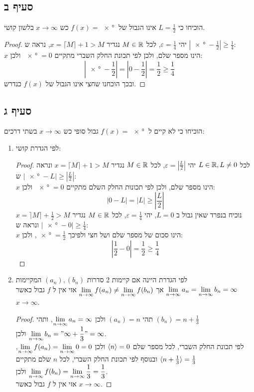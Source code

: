 \documentclass{article}
\begin{document}
	\subsection*{סעיף ב}
	הוכיחו כי $L = \frac{1}{2}$ אינו הגבול של $f(x) = \ang{x}$ כש $x \to \infty$ בלשון קושי.
	\begin{proof}
		יהי $\varepsilon = \frac{1}{4}$, לכל $M \in \mathbb{R}$ נגדיר $x = \lceil M \rceil + 1 > M$,
		נראה ש $|\ang{x} - \frac{1}{2}| \geq \frac{1}{4}$: \\
		$x$ הינו מספר שלם, ולכן לפי תכונת החלק השברי מתקיים $\ang{x} = 0$ ולכן:
		\[
			\left| \ang{x} - \frac{1}{2} \right| =
			\left| 0 - \frac{1}{2} \right| =
			\frac{1}{2} \geq \frac{1}{4}
		\]
		ובכך הוכחנו שחצי אינו הגבול של $f(x)$ כנדרש.
	\end{proof}

	\pagebreak

	\subsection*{סעיף ג}
	הוכיחו כי לא קיים ל $f(x) = \ang{x}$ גבול סופי כש $x \to \infty$ בשתי דרכים:
	\begin{enumerate}
		\item לפי הגדרת קושי:
		\begin{proof}
			לכל $L \in \mathbb{R}, L \neq 0$ יהי $\varepsilon = \left| \frac{L}{2} \right|$, לכל $M \in \mathbb{R}$ נגדיר $x = \lceil M \rceil + 1 > M$ ונראה ש $|\ang{x} - L| \geq \left| \frac{L}{2} \right|$: \\
			$x$ הינו מספר שלם, ולכן לפי תכונות החלק השלם מתקיים $\ang{x} = 0$ ולכן:
			\[
				\left|0 - L \right| = |L| \geq \left| \frac{L}{2} \right|
			\]
			נוכיח בנפרד שאין גבול ב $L = 0$, יהי $\varepsilon = \frac{1}{4}$, לכל $M \in \mathbb{R}$ נגדיר $x = \rceil M \rceil + \frac{1}{2} > M$ ונראה ש $|\ang{x} - 0| \geq \frac{1}{4}$: \\
			$x$ הינו סכום של מספר שלם ושל חצי ולפיכך $\ang{x} = \frac{1}{2}$, ולכן:
			\[
			\left| \frac{1}{2} - 0 \right| = \frac{1}{2} \geq \frac{1}{4}
			\]
		\end{proof}

		\item לפי הגדרת היינה אם קיימות 2 סדרות $(a_n), (b_n)$ המקיימות $\displaystyle{\lim_{n \to \infty}a_n = \lim_{n \to \infty}b_n = \infty}$ אך $\displaystyle{\lim_{n \to \infty}f(a_n) \neq \lim_{n \to \infty}f(b_n)}$ אזי אין ל $f$ גבול כאשר $x \to \infty$. \\
		\begin{proof} \nl
			תהי $(a_n) = n$ ולכן $\displaystyle{\lim_{n \to \infty}a_n = \infty}$, ותהי $(b_n) = n + \frac{1}{3}$ \\
			 ולכן $\displaystyle{\lim_{n \to \infty}b_n = "\infty + \frac{1}{3}" = \infty}$. \\
			לפי תכונת החלק השברי, לכל מספר שלם $\langle n \rangle = 0$ ולכן $\displaystyle{\lim_{n \to \infty}f(a_n) = \lim_{n \to \infty}0 = 0}$,
			 ובנוסף לפי תכונת החלק השברי, לכל $n$ שלם מתקיים $\langle n + \frac{1}{3} \rangle = \frac{1}{3}$ \\
			 ולכן $\displaystyle{\lim_{n \to \infty}f(b_n) = \lim_{n \to \infty}\frac{1}{3} = \frac{1}{3}}$. \\
			 אזי אין ל $f$ גבול כאשר $x \to \infty$.
		\end{proof}
	\end{enumerate}
\end{document}

